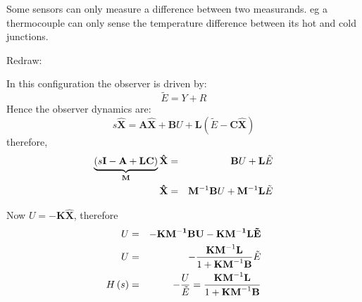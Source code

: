  
Some sensors can only measure a difference between two measurands. eg  a thermocouple can only sense the temperature difference between its hot and cold junctions.
\begin{center}
\end{center}
Redraw:
\begin{center}
\end{center}

In this configuration the observer is driven by:
\[
\tilde E =  Y + R
\] 
Hence the observer dynamics are:
\[
s\hat{\mathbf{X}}=\mathbf{A}\hat{\mathbf{X}}+\mathbf{B}U+\mathbf{L}(\tilde E - \mathbf{C}\hat{\mathbf{X}})
\]
therefore,
\begin{eqnarray*}
	\underbrace {\left( {s{\bf{I}} - {\bf{A}} + {\bf{LC}}} \right)}_{\bf{M}}{\bf{\hat X}} & = & {\bf{B}}U + {\bf{L}}\tilde E \\
	{\bf{\hat X}} & = & {\bf{M}}^{ - 1} {\bf{B}}U + {\bf{M}}^{ - 1} {\bf{L}}\tilde E
\end{eqnarray*}

Now $U=-\mathbf{K}\hat{\mathbf{X}}$, therefore
\begin{eqnarray*}
	U & = &  - \bf{KM}^{ - 1} {\bf{B}}U - {\bf{KM}}^{ - 1} {\bf{L}}\tilde E \\
	U & = &  - \frac{{{\bf{KM}}^{ - 1} {\bf{L}}}}{{1 + {\bf{KM}}^{ - 1} {\bf{B}}}}\tilde E \\
	H\left( s \right) & = &  - \frac{U}{{\tilde E}} = \frac{{{\bf{KM}}^{ - 1} {\bf{L}}}}{{1 + {\bf{KM}}^{ - 1} {\bf{B}}}}
\end{eqnarray*}

